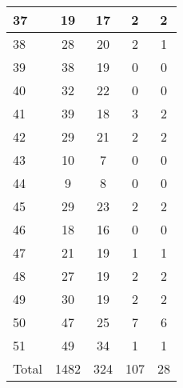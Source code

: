 \begin{center}
\begin{longtable}{l|c|c|c|c}
37 & 19 & 17 & 2 & 2\\ \hline
38 & 28 & 20 & 2 & 1\\ \hline
39 & 38 & 19 & 0 & 0\\ \hline
40 & 32 & 22 & 0 & 0\\ \hline
41 & 39 & 18 & 3 & 2\\ \hline
42 & 29 & 21 & 2 & 2\\ \hline
43 & 10 & 7 & 0 & 0\\ \hline
44 & 9 & 8 & 0 & 0\\ \hline
45 & 29 & 23 & 2 & 2\\ \hline
46 & 18 & 16 & 0 & 0\\ \hline
47 & 21 & 19 & 1 & 1\\ \hline
48 & 27 & 19 & 2 & 2\\ \hline
49 & 30 & 19 & 2 & 2\\ \hline
50 & 47 & 25 & 7 & 6\\ \hline
51 & 49 & 34 & 1 & 1\\ \hline
\hline \hline
Total & 1482 & 324 & 107 & 28



\end{longtable}
\end{center}

 

